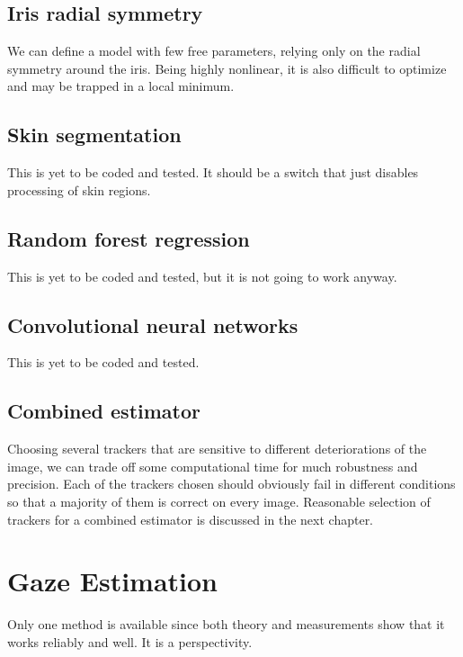 \subsection{Iris radial symmetry}
We can define a model with few free parameters, relying only on the radial symmetry around the iris.
Being highly nonlinear, it is also difficult to optimize and may be trapped in a local minimum.

\subsection{Skin segmentation}
This is yet to be coded and tested.
It should be a switch that just disables processing of skin regions.

\subsection{Random forest regression}
This is yet to be coded and tested, but it is not going to work anyway.

\subsection{Convolutional neural networks}
This is yet to be coded and tested.

\subsection{Combined estimator}

Choosing several trackers that are sensitive to different deteriorations of the image, we can trade off some computational time for much robustness and precision.
Each of the trackers chosen should obviously fail in different conditions so that a majority of them is correct on every image.
Reasonable selection of trackers for a combined estimator is discussed in the next chapter.

\section{Gaze Estimation}

Only one method is available since both theory and measurements show that it works reliably and well.
It is a perspectivity.
